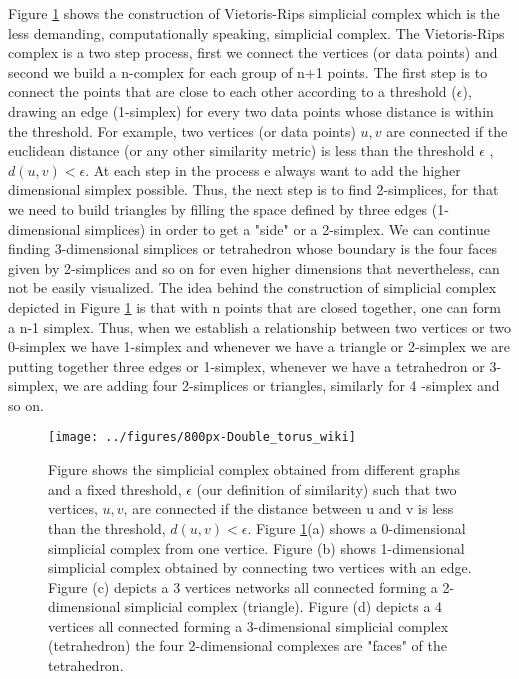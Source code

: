 \documentclass[onecollarge,runningheads]{svjour2}
\begin{document}
Figure \ref{fig:vrcomplex} shows the construction of Vietoris-Rips simplicial complex which is the less demanding, computationally speaking, simplicial complex. The Vietoris-Rips complex is a two step process, first we connect the vertices (or data points) and second we build a n-complex for each group of n+1 points. The first step is to connect the points that are close to each other according to a threshold ($\epsilon$), drawing an edge (1-simplex) for every two data points whose distance is within the threshold. For example, two vertices (or data points) $u,v$ are connected if the euclidean distance (or any other similarity metric) is less than the threshold $\epsilon$ , $d(u,v) < \epsilon$. At each step in the process e always want to add the higher dimensional simplex possible. Thus, the next step is to find 2-simplices, for that we need to build triangles by filling the space defined by three edges (1-dimensional simplices) in order to get a "side" or a 2-simplex. We can continue finding 3-dimensional simplices or tetrahedron whose boundary is the four faces given by 2-simplices and so on for even higher dimensions that nevertheless, can not be easily visualized. The idea behind the construction of simplicial complex depicted in Figure \ref{fig:vrcomplex} is that with n points that are closed together, one can form a n-1 simplex. Thus, when we establish a relationship between two vertices or two 0-simplex we have 1-simplex and whenever we have a triangle or 2-simplex we are putting together three edges or 1-simplex, whenever we have a tetrahedron or 3-simplex, we are adding four 2-simplices or triangles, similarly for 4 -simplex and so on. 

\begin{figure}[h]
        \centering
        \texttt{[image: ../figures/800px-Double\_torus\_wiki]}
        \caption{Figure shows the simplicial complex obtained from different graphs and a fixed threshold, $\epsilon$ (our definition of similarity) such that two vertices, $u, v$, are connected if the distance between u and v is less than the threshold, $d(u,v) < \epsilon$. Figure \ref{fig:vrcomplex}(a) shows a 0-dimensional simplicial complex from one vertice. Figure (b) shows 1-dimensional simplicial complex obtained by connecting two vertices with an edge. Figure (c) depicts a 3 vertices networks all connected forming a 2-dimensional simplicial complex (triangle). Figure (d) depicts a 4 vertices all connected forming a 3-dimensional simplicial complex (tetrahedron) the four 2-dimensional complexes are "faces" of the tetrahedron.}
\label{fig:vrcomplex}
\end{figure}
\end{document}

